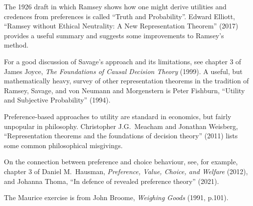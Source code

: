 \begin{sources}

  The 1926 draft in which Ramsey shows how one might derive utilities and
  credences from preferences is called ``Truth and Probability''. Edward
  Elliott, ``Ramsey without Ethical Neutrality: A New Representation Theorem''
  (2017) provides a useful summary and suggests some improvements to Ramsey's
  method.

  For a good discussion of Savage's approach and its limitations, see chapter 3
  of James Joyce, \emph{The Foundations of Causal Decision Theory} (1999). A useful,
  but mathematically heavy, survey of other representation theorems in the
  tradition of Ramsey, Savage, and von Neumann and Morgenstern is Peter
  Fishburn, ``Utility and Subjective Probability'' (1994).

  Preference-based approaches to utility are standard in economics, but fairly
  unpopular in philosophy. Christopher J.G.\ Meacham and Jonathan Weisberg,
  ``Representation theorems and the foundations of decision theory'' (2011)
  lists some common philosophical misgivings.


  On the connection between preference and choice behaviour, see, for example,
  chapter 3 of Daniel M.\ Hausman, \emph{Preference, Value, Choice, and Welfare}
  (2012), and
  Johanna Thoma, ``In defence of revealed preference theory'' (2021).

  The Maurice exercise is from John Broome, \emph{Weighing Goods} (1991,
  p.101).

\end{sources}







